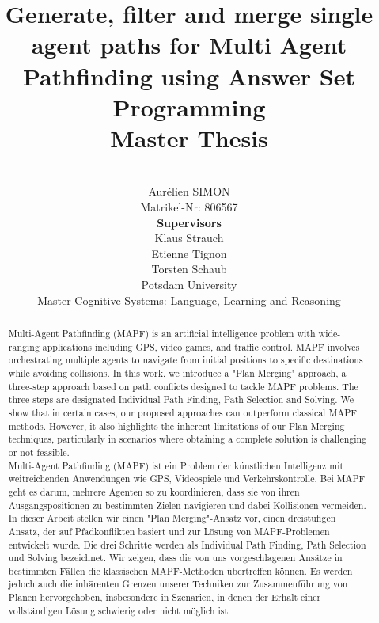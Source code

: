 \documentclass{report}
\title{%
\Huge{Generate, filter and merge single agent paths for Multi Agent Pathfinding using Answer Set Programming}\\[0.2cm]
\Large{Master Thesis}
}
\author{
\\[1.5cm] \LARGE{Aurélien SIMON}
\\[0.2cm] \small{Matrikel-Nr: 806567 }
\\[1cm] \textbf{Supervisors}
\\[0.2cm] Klaus Strauch 
\\[0.2cm] Etienne Tignon
\\[0.2cm] Torsten Schaub
\\[2cm] \Large{Potsdam University}
\\[0.4cm] Master Cognitive Systems: Language, Learning and Reasoning 
\\[1cm]
}
\theoremstyle{definition}
\begin{document}
\pagestyle{fancy}

\maketitle


\fancyhead{} %


\newpage

\begin{abstract}
    
     Multi-Agent Pathfinding (MAPF) is an artificial intelligence problem with wide-ranging applications including GPS, video games, and traffic control. MAPF involves orchestrating multiple agents to navigate from initial positions to specific destinations while avoiding collisions. In this work, we introduce a "Plan Merging" approach, a three-step approach based on path conflicts designed to tackle MAPF problems. The three steps are designated Individual Path Finding, Path Selection and Solving. We show that in certain cases, our proposed approaches can outperform classical MAPF methods. However, it also highlights the inherent limitations of our Plan Merging techniques, particularly in scenarios where obtaining a complete solution is challenging or not feasible.
    \\[1cm]
    \indent Multi-Agent Pathfinding (MAPF) ist ein Problem der künstlichen Intelligenz mit weitreichenden Anwendungen wie GPS, Videospiele und Verkehrskontrolle. Bei MAPF geht es darum, mehrere Agenten so zu koordinieren, dass sie von ihren Ausgangspositionen zu bestimmten Zielen navigieren und dabei Kollisionen vermeiden. In dieser Arbeit stellen wir einen "Plan Merging"-Ansatz vor, einen dreistufigen Ansatz, der auf Pfadkonflikten basiert und zur Lösung von MAPF-Problemen entwickelt wurde. Die drei Schritte werden als Individual Path Finding, Path Selection und Solving bezeichnet. Wir zeigen, dass die von uns vorgeschlagenen Ansätze in bestimmten Fällen die klassischen MAPF-Methoden übertreffen können. Es werden jedoch auch die inhärenten Grenzen unserer Techniken zur Zusammenführung von Plänen hervorgehoben, insbesondere in Szenarien, in denen der Erhalt einer vollständigen Lösung schwierig oder nicht möglich ist.

\end{abstract}
\end{document}
